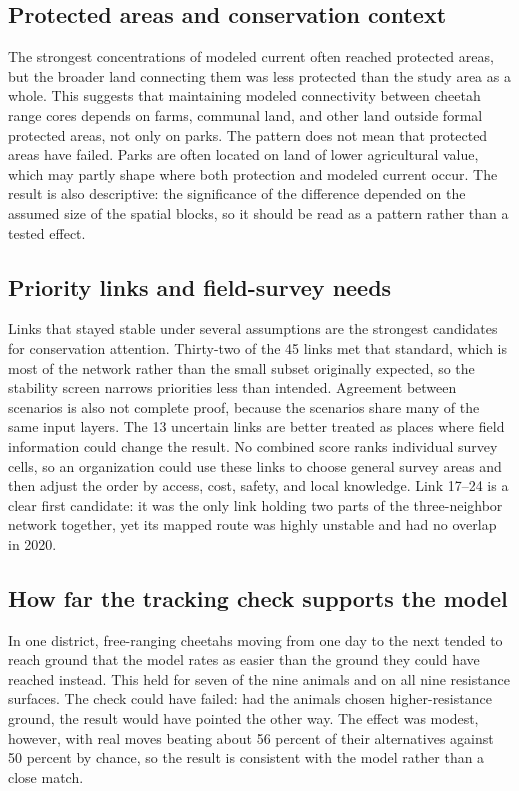 \subsection{Protected areas and conservation context}

The strongest concentrations of modeled current often reached protected areas, but the broader land connecting them was less protected than the study area as a whole. This suggests that maintaining modeled connectivity between cheetah range cores depends on farms, communal land, and other land outside formal protected areas, not only on parks. The pattern does not mean that protected areas have failed. Parks are often located on land of lower agricultural value, which may partly shape where both protection and modeled current occur. The result is also descriptive: the significance of the difference depended on the assumed size of the spatial blocks, so it should be read as a pattern rather than a tested effect.

\subsection{Priority links and field-survey needs}

Links that stayed stable under several assumptions are the strongest candidates for conservation attention. Thirty-two of the 45 links met that standard, which is most of the network rather than the small subset originally expected, so the stability screen narrows priorities less than intended. Agreement between scenarios is also not complete proof, because the scenarios share many of the same input layers. The 13 uncertain links are better treated as places where field information could change the result. No combined score ranks individual survey cells, so an organization could use these links to choose general survey areas and then adjust the order by access, cost, safety, and local knowledge. Link 17--24 is a clear first candidate: it was the only link holding two parts of the three-neighbor network together, yet its mapped route was highly unstable and had no overlap in 2020.

\subsection{How far the tracking check supports the model}

In one district, free-ranging cheetahs moving from one day to the next tended to reach ground that the model rates as easier than the ground they could have reached instead. This held for seven of the nine animals and on all nine resistance surfaces. The check could have failed: had the animals chosen higher-resistance ground, the result would have pointed the other way. The effect was modest, however, with real moves beating about 56 percent of their alternatives against 50 percent by chance, so the result is consistent with the model rather than a close match.

